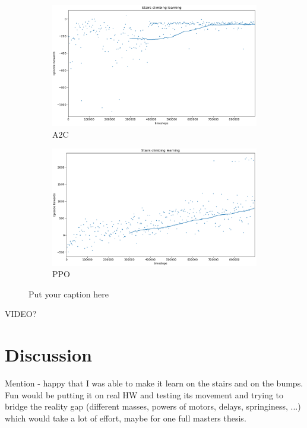 \documentclass{article}
\begin{document}
\begin{figure}[ht]
\begin{subfigure}{.5\textwidth}
  \centering
  \includegraphics[width=.95\linewidth]{figc/Stairs_climbing_learning_300ep_final_a2c.png}  
  \caption{A2C}
  \label{fig:sub-first}
\end{subfigure}
\begin{subfigure}{.5\textwidth}
  \centering
  \includegraphics[width=.95\linewidth]{figc/Stairs_climbing_learning_300ep_final.png}  
  \caption{PPO}
  \label{fig:sub-second}
\end{subfigure}
\caption{Put your caption here}
\label{fig:fig}
\end{figure}

\cite{ppo}
VIDEO?
\section{Discussion}
Mention - happy that I was able to make it learn on the stairs and on the bumps.
Fun would be putting it on real HW and testing its movement and trying to bridge the reality gap (different masses, powers of motors, delays, springiness, ...) which would take a lot of effort, maybe for one full masters thesis.


% 

% 

\end{document}
